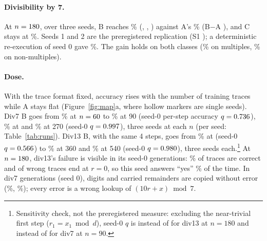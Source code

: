 \documentclass{article}
\theoremstyle{definition}
\begin{document}
\paragraph{Divisibility by 7.} At $n=180$, over three seeds, B reaches \divsevenB\% (\divsevenBsZero, \divsevenBsOne, \divsevenBsTwo) against A's \divsevenA\% (B$-$A \divsevenBAdiff{} \divsevenBAci), and C stays at \divsevenC\%. Seeds 1 and 2 are the preregistered replication (S1 \verdictSOne); a deterministic re-execution of seed 0 gave \divsevenBsZeroRerun\%. The gain holds on both classes (\divsevenByes\% on multiples, \divsevenBno\% on non-multiples).

\paragraph{Dose.} With the trace format fixed, accuracy rises with the number of training traces while A stays flat (Figure~\ref{fig:map}a, where hollow markers are single seeds). Div7 B goes from \divsevenBnSixty\% at $n=60$ to \divsevenBnNinety\% at 90 (seed-0 per-step accuracy $q=0.736$), \divsevenBnOneEighty\% at \nTrain{} and \divsevenBnTwoSeventy\% at 270 (seed-0 $q=0.997$), three seeds at each $n$ (per seed: Table~\ref{tab:runs}). Div13 B, with the same 4 steps, goes from \divthirteenBnOneEighty\% at \nTrain{} (seed-0 $q=0.566$) to \divthirteenBnThreeSixty\% at 360 and \divthirteenBnFiveForty\% at 540 (seed-0 $q=0.980$), three seeds each.\footnote{Sensitivity check, not the preregistered measure: excluding the near-trivial first step ($r_1=x_1\bmod d$), seed-0 $q$ is \qAfterDivthirteenOneEighty{} instead of \qAllDivthirteenOneEighty{} for div13 at $n=180$ and \qAfterDivsevenNinety{} instead of \qAllDivsevenNinety{} for div7 at $n=90$.} At $n=180$, div13's failure is visible in its seed-0 generations: \divthirteenTraceOK\% of traces are correct and \divthirteenWrongZero{} of \divthirteenWrongN{} wrong traces end at $r=0$, so this seed answers ``yes'' \divthirteenPredYes\% of the time. In div7 generations (seed 0), digits and carried remainders are copied without error (\divsevenDigitCopy\%, \divsevenCarry\%); every error is a wrong lookup of $(10r+x)\bmod 7$.
\end{document}
